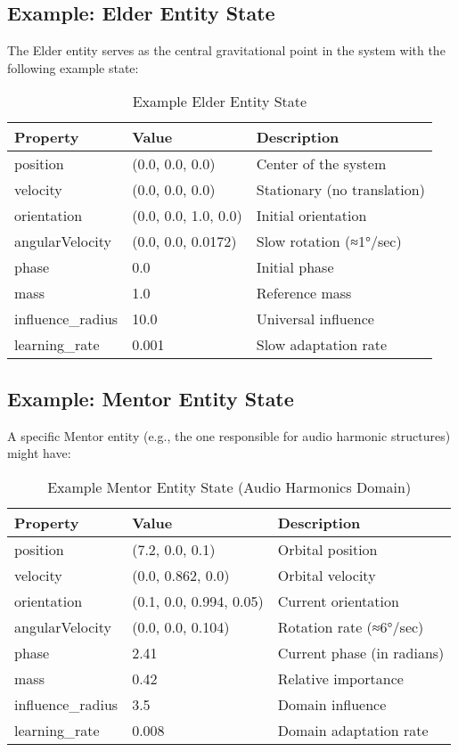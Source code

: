\subsection{Example: Elder Entity State}

The Elder entity serves as the central gravitational point in the system with the following example state:

\begin{table}[h]
\centering
\begin{tabular}{|l|l|l|}
\hline
\textbf{Property} & \textbf{Value} & \textbf{Description} \\
\hline
position & (0.0, 0.0, 0.0) & Center of the system \\
velocity & (0.0, 0.0, 0.0) & Stationary (no translation) \\
orientation & (0.0, 0.0, 1.0, 0.0) & Initial orientation \\
angularVelocity & (0.0, 0.0, 0.0172) & Slow rotation (≈1°/sec) \\
phase & 0.0 & Initial phase \\
mass & 1.0 & Reference mass \\
influence\_radius & 10.0 & Universal influence \\
learning\_rate & 0.001 & Slow adaptation rate \\
\hline
\end{tabular}
\caption{Example Elder Entity State}
\end{table}

\subsection{Example: Mentor Entity State}

A specific Mentor entity (e.g., the one responsible for audio harmonic structures) might have:

\begin{table}[h]
\centering
\begin{tabular}{|l|l|l|}
\hline
\textbf{Property} & \textbf{Value} & \textbf{Description} \\
\hline
position & (7.2, 0.0, 0.1) & Orbital position \\
velocity & (0.0, 0.862, 0.0) & Orbital velocity \\
orientation & (0.1, 0.0, 0.994, 0.05) & Current orientation \\
angularVelocity & (0.0, 0.0, 0.104) & Rotation rate (≈6°/sec) \\
phase & 2.41 & Current phase (in radians) \\
mass & 0.42 & Relative importance \\
influence\_radius & 3.5 & Domain influence \\
learning\_rate & 0.008 & Domain adaptation rate \\
\hline
\end{tabular}
\caption{Example Mentor Entity State (Audio Harmonics Domain)}
\end{table}

